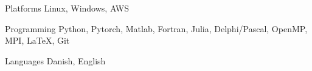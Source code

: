 

\begin{cvskills}

  \cvskill
    {Platforms} %
    {Linux, Windows, AWS} %


  \cvskill
    {Programming} %
    {Python, Pytorch, Matlab, Fortran, Julia, Delphi/Pascal, OpenMP, MPI, LaTeX, Git} %

  \cvskill
    {Languages} %
    {Danish, English} %

\end{cvskills}
